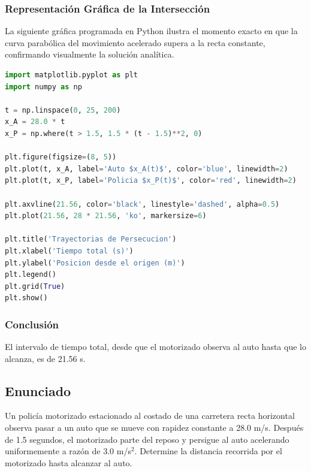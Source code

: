 \documentclass[12pt, a4paper]{article}
\begin{document}
\subsubsection*{Representación Gráfica de la Intersección}

La siguiente gráfica programada en Python ilustra el momento exacto en que la curva parabólica del movimiento acelerado supera a la recta constante, confirmando visualmente la solución analítica.

\begin{lstlisting}[language=Python]
import matplotlib.pyplot as plt
import numpy as np

t = np.linspace(0, 25, 200)
x_A = 28.0 * t
x_P = np.where(t > 1.5, 1.5 * (t - 1.5)**2, 0)

plt.figure(figsize=(8, 5))
plt.plot(t, x_A, label='Auto $x_A(t)$', color='blue', linewidth=2)
plt.plot(t, x_P, label='Policia $x_P(t)$', color='red', linewidth=2)

plt.axvline(21.56, color='black', linestyle='dashed', alpha=0.5)
plt.plot(21.56, 28 * 21.56, 'ko', markersize=6)

plt.title('Trayectorias de Persecucion')
plt.xlabel('Tiempo total (s)')
plt.ylabel('Posicion desde el origen (m)')
plt.legend()
plt.grid(True)
plt.show()
\end{lstlisting}

\subsubsection*{Conclusión}

El intervalo de tiempo total, desde que el motorizado observa al auto hasta que lo alcanza, es de 21.56 s.

\newpage

\subsection*{Enunciado}

Un policía motorizado estacionado al costado de una carretera recta horizontal observa pasar a un auto que se mueve con rapidez constante a 28.0 m/s. Después de 1.5 segundos, el motorizado parte del reposo y persigue al auto acelerando uniformemente a razón de 3.0 m/s$^2$. Determine la distancia recorrida por el motorizado hasta alcanzar al auto.

\vspace{0.5cm}
\end{document}
